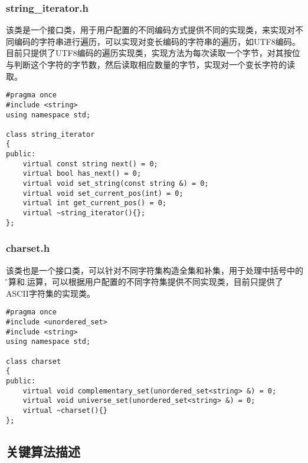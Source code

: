 \subsubsection{string\_iterator.h}
该类是一个接口类，用于用户配置的不同编码方式提供不同的实现类，来实现对不同编码的字符串进行遍历，可以实现对变长编码的字符串的遍历，如UTF8编码。目前只提供了UTF8编码的遍历实现类，实现方法为每次读取一个字节，对其按位与判断这个字符的字节数，然后读取相应数量的字节，实现对一个变长字符的读取。
\lstset{language=C++}
\begin{lstlisting}
#pragma once
#include <string>
using namespace std;

class string_iterator
{
public:
    virtual const string next() = 0;
    virtual bool has_next() = 0;
    virtual void set_string(const string &) = 0;
    virtual void set_current_pos(int) = 0;
    virtual int get_current_pos() = 0;
    virtual ~string_iterator(){};
};
\end{lstlisting}
\subsubsection{charset.h}
该类也是一个接口类，可以针对不同字符集构造全集和补集，用于处理中括号中的\^运算和.运算，可以根据用户配置的不同字符集提供不同实现类，目前只提供了ASCII字符集的实现类。
\lstset{language=C++}
\begin{lstlisting}
#pragma once
#include <unordered_set>
#include <string>
using namespace std;

class charset
{
public:
    virtual void complementary_set(unordered_set<string> &) = 0;
    virtual void universe_set(unordered_set<string> &) = 0;
    virtual ~charset(){}
};
\end{lstlisting}
\subsection{关键算法描述}
